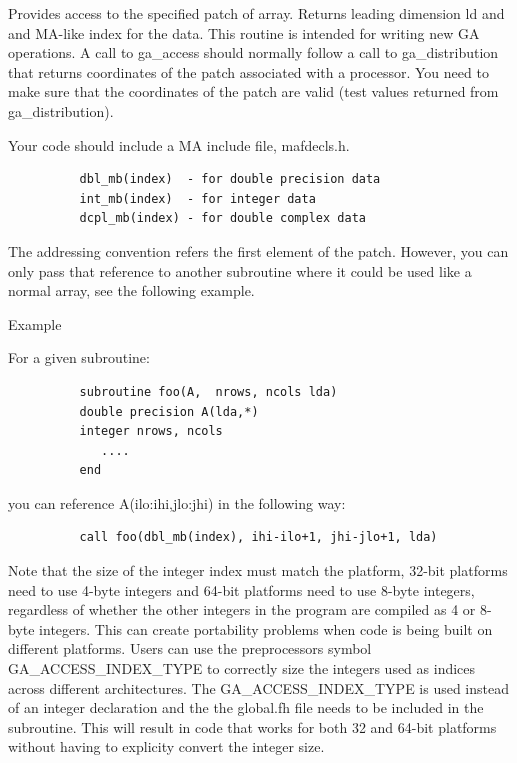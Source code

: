 \documentclass[12pt]{article}
\begin{document}
\begin{fdesc}

Provides access to the specified patch of array. Returns leading dimension ld
and and MA-like index for the data. This routine is intended for writing new GA
operations. A call to ga_access should normally follow a call to ga_distribution
that returns coordinates of the patch associated with a processor. You need to
make sure that the coordinates of the patch are valid (test values returned
from ga_distribution).

Your code should include a MA include file, mafdecls.h.
\begin{verbatim}
          dbl_mb(index)  - for double precision data
          int_mb(index)  - for integer data
          dcpl_mb(index) - for double complex data
\end{verbatim}

The addressing convention refers the first element of the patch.
However, you can only pass that reference to another subroutine where it could
be used like a normal array, see the following example.

Example

For a given subroutine:
\begin{verbatim}
          subroutine foo(A,  nrows, ncols lda)
          double precision A(lda,*)
          integer nrows, ncols
             ....
          end
\end{verbatim}
you can reference A(ilo:ihi,jlo:jhi) in the following way:

\begin{verbatim}
          call foo(dbl_mb(index), ihi-ilo+1, jhi-jlo+1, lda)
\end{verbatim}

Note that the size of the integer index must match the platform, 32-bit
platforms need to use 4-byte integers and 64-bit platforms need to use 8-byte
integers, regardless of whether the other integers in the program are compiled
as 4 or 8-byte integers. This can create portability problems when code is being
built on different platforms. Users can use the preprocessors symbol
GA_ACCESS_INDEX_TYPE to correctly size the integers used as indices across
different architectures. The GA_ACCESS_INDEX_TYPE is used instead of an integer
declaration and the the global.fh file needs to be included in the subroutine.
This will result in code that works for both 32 and 64-bit platforms without
having to explicity convert the integer size.

\end{fdesc}
\end{document}
